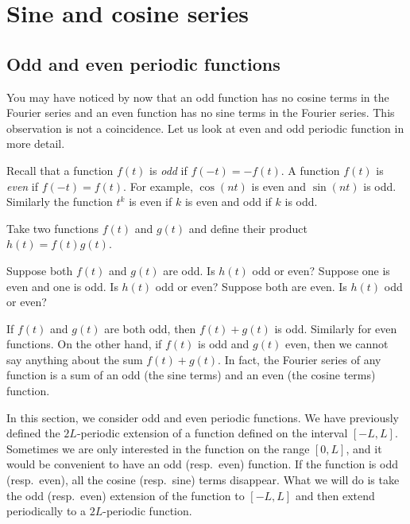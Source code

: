 
\sectionnewpage
\section{Sine and cosine series}
\label{sec:scs}



\subsection{Odd and even periodic functions}

You may have noticed by now that an odd function has no cosine terms in the 
Fourier series and an even function has no sine terms in the Fourier series.
This observation is not a coincidence.  Let us look at even and odd periodic
function in more detail.

Recall that a function $f(t)$ is \emph{odd} if $f(-t) =
-f(t)$.  A function $f(t)$ is \emph{even} if
$f(-t) = f(t)$.  For example, $\cos (n t)$ is even and $\sin (n t)$ is odd.
Similarly the function $t^k$ is even if $k$ is even and odd if $k$ is odd.

\begin{exercise}
Take two functions $f(t)$ and $g(t)$ and define their product $h(t) =
f(t)g(t)$.
\begin{tasks}
\task Suppose both $f(t)$ and $g(t)$ are odd.  Is $h(t)$ odd or even?
\task Suppose one is even and one is odd.  Is $h(t)$ odd or even?
\task Suppose both are even.  Is $h(t)$ odd or even?
\end{tasks}
\end{exercise}

If $f(t)$ and $g(t)$ are both odd, then $f(t)+g(t)$ is odd.  Similarly for
even functions.  On the other hand,
if $f(t)$ is odd and $g(t)$ even, then we cannot say anything about
the sum
$f(t) + g(t)$.  In fact, the Fourier series of any function is a sum of
an odd (the sine terms) and an even (the cosine terms) function.

In this section, we consider odd and even periodic
functions.  We have previously defined the $2L$-periodic extension
of a function defined on the interval $[-L,L]$.  Sometimes we are only
interested in the function on the range $[0,L]$, and it would be convenient
to have an odd (resp.\ even) function.  If the function is odd (resp.\ even),
all the cosine (resp.\ sine) terms disappear.
What we will do is
take the
odd (resp.\ even) extension of the function to $[-L,L]$ and then 
extend periodically to a $2L$-periodic function.

